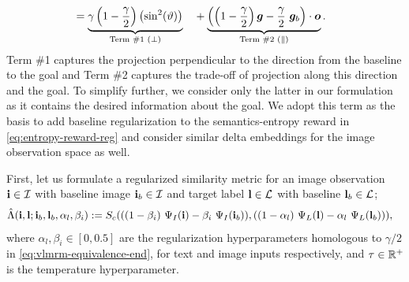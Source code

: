 \begin{align}
    &= \underbrace{\gamma\left(1 - \dfrac{\gamma}{2}\right)\left(\sin^2(\vartheta)\right)}_{\text{Term \#1 (\(\perp\))}} &&+ \underbrace{\left(\left(1 - \dfrac{\gamma}{2}\right) \bm{g} - \dfrac{\gamma}{2}\ \bm{g}_b\right) \cdot \bm{o}}_{\text{Term \#2 (\(\parallel\))}}.
    \label{eq:vlmrm-equivalence-end}
\end{align}
Term \#1 captures the projection perpendicular to the direction from the baseline to the goal and Term \#2 captures the trade-off of projection along this direction and the goal.
To simplify further, we consider only the latter in our formulation as it contains the desired information about the goal.
We adopt this term as the basis to add baseline regularization to the semantics-entropy reward in \eqref{eq:entropy-reward-reg} and consider similar delta embeddings for the image observation space as well.

First, let us formulate a regularized similarity metric for an image observation \(\mathbf{i} \in \mathcal{I}\) with baseline image \(\mathbf{i}_b \in \mathcal{I}\) and target label \(\mathbf{l} \in \mathcal{L}\) with baseline \(\mathbf{l}_b \in \mathcal{L}\);
\begin{equation}
    \label{eq:clip-similarity-reg}
    \begin{split}
        \hat{\Lambda}(\mathbf{i}, \mathbf{l}; \mathbf{i}_b, \mathbf{l}_b, \alpha_{l}, \beta_{i})
        &:= S_c(
            ((1 - \beta_{i})\ \Psi_I(\mathbf{i}) - \beta_{i}\ \Psi_I(\mathbf{i}_b)),
            ((1 - \alpha_{l})\ \Psi_L(\mathbf{l}) - \alpha_{l}\ \Psi_L(\mathbf{l}_b))
        ),
    \end{split}
\end{equation}
where \(\alpha_{l}, \beta_{i} \in [0, 0.5]\) are the regularization hyperparameters homologous to \(\gamma / 2\) in \eqref{eq:vlmrm-equivalence-end}, for text and image inputs respectively, and \(\tau \in \mathbb{R}^+\) is the temperature hyperparameter.

